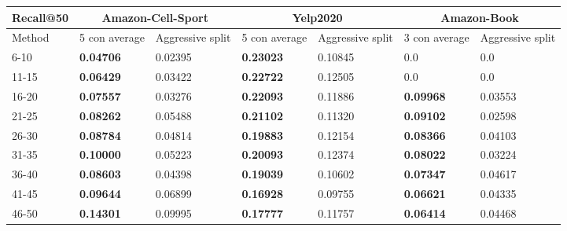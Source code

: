 \begin{table*}[]
    \centering
    \begin{tabular}{|l|l|l||l|l||l|l|}
        \hline
        Recall@50 & \multicolumn{2}{c||}{Amazon-Cell-Sport} & \multicolumn{2}{c||}{Yelp2020} & \multicolumn{2}{c|}{Amazon-Book}                                                          \\ \hline
        Method    & 5 con average                           & Aggressive split               & 5 con average                    & Aggressive split & 3 con average    & Aggressive split \\ \hline
        6-10      & \textbf{0.04706}                        & 0.02395                        & \textbf{0.23023}                 & 0.10845          & 0.0              & 0.0              \\ \hline
        11-15     & \textbf{0.06429}                        & 0.03422                        & \textbf{0.22722}                 & 0.12505          & 0.0              & 0.0              \\ \hline
        16-20     & \textbf{0.07557}                        & 0.03276                        & \textbf{0.22093}                 & 0.11886          & \textbf{0.09968} & 0.03553          \\ \hline
        21-25     & \textbf{0.08262}                        & 0.05488                        & \textbf{0.21102}                 & 0.11320          & \textbf{0.09102} & 0.02598          \\ \hline
        26-30     & \textbf{0.08784}                        & 0.04814                        & \textbf{0.19883}                 & 0.12154          & \textbf{0.08366} & 0.04103          \\ \hline
        31-35     & \textbf{0.10000}                        & 0.05223                        & \textbf{0.20093}                 & 0.12374          & \textbf{0.08022} & 0.03224          \\ \hline
        36-40     & \textbf{0.08603}                        & 0.04398                        & \textbf{0.19039}                 & 0.10602          & \textbf{0.07347} & 0.04617          \\ \hline
        41-45     & \textbf{0.09644}                        & 0.06899                        & \textbf{0.16928}                 & 0.09755          & \textbf{0.06621} & 0.04335          \\ \hline
        46-50     & \textbf{0.14301}                        & 0.09995                        & \textbf{0.17777}                 & 0.11757          & \textbf{0.06414} & 0.04468          \\ \hline

\end{tabular}
\end{table*}
